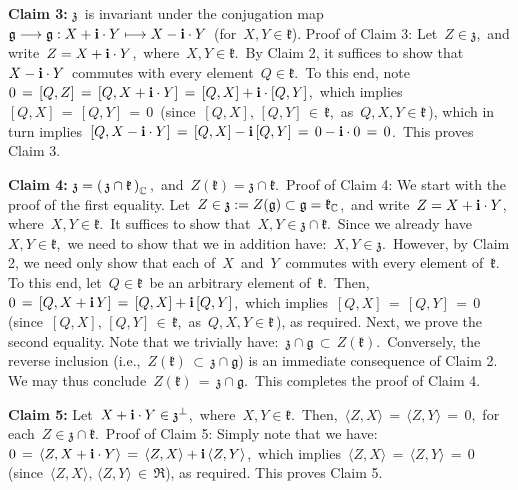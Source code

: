 \vskip 0.3cm
\noindent
\textbf{Claim 3:}\;\; $\mathfrak{z}$\, is invariant under the conjugation map
\,$\mathfrak{g} \longrightarrow \mathfrak{g} : X + \mathbf{i} \cdot Y \longmapsto X - \mathbf{i}\cdot Y$\,
(for \,$X, Y \in \mathfrak{k}$).
\vskip 0.05cm
\noindent
Proof of Claim 3:\;\;
Let \,$Z \in \mathfrak{z}$,\, and write \,$Z = X + \mathbf{i}\cdot Y$,\, where \,$X, Y \in \mathfrak{k}$.\,
By Claim 2, it suffices to show that \,$X - \mathbf{i}\cdot Y$\, commutes with every element \,$Q \in \mathfrak{k}$.\,
To this end, note
\,$0 \,=\, [Q,Z] \,=\, [Q,X+\mathbf{i}\cdot Y] \,=\, [Q,X] + \mathbf{i}\cdot[Q,Y]$,\,
which implies
\,$[Q,X] \,=\, [Q,Y] \,=\, 0$\,
(since \,$[Q,X],\, [Q,Y] \,\in\, \mathfrak{k}$,\, as \,$Q,X,Y \in \mathfrak{k}$\,),
which in turn implies
\,$[Q,X-\mathbf{i}\cdot Y] \,=\, [Q,X] - \mathbf{i}\,[Q,Y] \,=\, 0 - \mathbf{i}\cdot 0 \,=\, 0$.\,
This proves Claim 3.

\vskip 0.3cm
\noindent
\textbf{Claim 4:}\;\;
$\mathfrak{z} = \left(\,\mathfrak{z}\cap\mathfrak{k}\,\right)_{\mathbb{C}}$\,,\,
and
\,$Z(\mathfrak{k}) = \mathfrak{z} \cap \mathfrak{k}$.\,
\vskip 0.05cm
\noindent
Proof of Claim 4:\;\;
We start with the proof of the first equality.
Let \,$Z \in \mathfrak{z} := Z(\mathfrak{g}) \subset \mathfrak{g} = \mathfrak{k}_{\mathbb{C}}$,\,
and write \,$Z = X + \mathbf{i}\cdot Y$,\, where \,$X, Y \in \mathfrak{k}$.\,
It suffices to show that \,$X, Y \in \mathfrak{z} \cap \mathfrak{k}$.\,
Since we already have \,$X, Y \in \mathfrak{k}$,\,
we need to show that we in addition have: \,$X, Y \in \mathfrak{z}$.\,
However, by Claim 2, we need only show that
each of \,$X$\, and \,$Y$\, commutes with every element of \,$\mathfrak{k}$.\,
To this end, let \,$Q \in \mathfrak{k}$\, be an arbitrary element of \,$\mathfrak{k}$.\,
Then,
\,$0 \,=\, [Q,X+\mathbf{i}\,Y] \,=\, [Q,X] + \mathbf{i}\,[Q,Y]$,\,
which implies
\,$[Q,X] \,=\, [Q,Y] \,=\, 0$\,
(since \,$[Q,X],\, [Q,Y] \,\in\, \mathfrak{k}$,\, as \,$Q,X,Y \in \mathfrak{k}$\,), as required.
Next, we prove the second equality.
Note that we trivially have:
\,$\mathfrak{z} \cap \mathfrak{g} \,\subset\, Z(\mathfrak{k})$.\,
Conversely, the reverse inclusion
(i.e., \,$Z(\mathfrak{k}) \,\subset\, \mathfrak{z} \cap \mathfrak{g}$)
is an immediate consequence of Claim 2.
We may thus conclude
\,$Z(\mathfrak{k}) \,=\, \mathfrak{z} \cap \mathfrak{g}$.\,
This completes the proof of Claim 4.

\vskip 0.3cm
\noindent
\textbf{Claim 5:}\;\;
Let \,$X + \mathbf{i}\cdot Y \in \mathfrak{z}^{\perp}$,\, where \,$X, Y \in \mathfrak{k}$.\,
Then,
\,$\langle Z,X \rangle \,=\, \langle Z,Y \rangle \,=\, 0$,\,
for each \,$Z \in \mathfrak{z} \cap \mathfrak{k}$.\,
\vskip 0.05cm
\noindent
Proof of Claim 5:\;\;
Simply note that we have:
\,$0 \,=\, \langle Z,X+\mathbf{i}\cdot Y\rangle \,=\, \langle Z,X\rangle + \mathbf{i}\,\langle Z,Y\rangle$,\,
which implies
\,$\langle Z,X \rangle \,=\, \langle Z,Y \rangle \,=\, 0$\,
(since \,$\langle Z,X \rangle,\, \langle Z,Y \rangle \,\in\, \Re$), as required.
This proves Claim 5.

